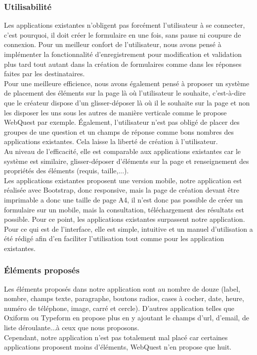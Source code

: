 \documentclass{sigplanconf}
\begin{document}
\subsubsection{Utilisabilité}
Les applications existantes n’obligent pas forcément l’utilisateur à se connecter, c’est pourquoi, il doit créer le formulaire en une fois, sans pause ni coupure de connexion. Pour un meilleur confort de l’utilisateur, nous avons pensé à implémenter la fonctionnalité d’enregistrement pour modification et validation plus tard tout autant dans la création de formulaires comme dans les réponses faites par les destinataires.\\
Pour une meilleure efficience, nous avons également pensé à proposer un système de placement des éléments sur la page là où l’utilisateur le souhaite, c’est-à-dire que le créateur dispose d’un glisser-déposer là où il le souhaite sur la page et non les disposer les uns sous les autres de manière verticale comme le propose WebQuest par exemple. Également, l’utilisateur n’est pas obligé de placer des groupes de une question et un champs de réponse comme bons nombres des applications existantes. Cela laisse la liberté de création à l’utilisateur.\\
Au niveau de l’efficacité, elle est comparable aux applications existantes car le système est similaire, glisser-déposer d’éléments sur la page et renseignement des propriétés des éléments (requis, taille,...).\\
Les applications existantes proposent une version mobile, notre application est réalisée avec Bootstrap, donc responsive, mais la page de création devant être imprimable a donc une taille de page A4, il n’est donc pas possible de créer un formulaire sur un mobile, mais la consultation, téléchargement des résultats est possible. Pour ce point, les applications existantes surpassent notre application.\\
Pour ce qui est de l’interface, elle est simple, intuitive et un manuel d’utilisation a été rédigé afin d’en faciliter l’utilisation tout comme pour les application existantes.
\subsubsection{Éléments proposés}
Les éléments proposés dans notre application sont au nombre de douze (label, nombre, champs texte, paragraphe, boutons radios, cases à cocher, date, heure, numéro de téléphone, image, carré et cercle). D’autres application telles que Oxiform\cite{urlOxiForm} ou Typeform\cite{urlTypeForm} en propose plus en y ajoutant le champs d’url, d’email, de liste déroulante...à ceux que nous proposons.\\ Cependant, notre application n’est pas totalement mal placé car certaines applications proposent moins d’éléments, WebQuest n’en propose que huit.
\end{document}
